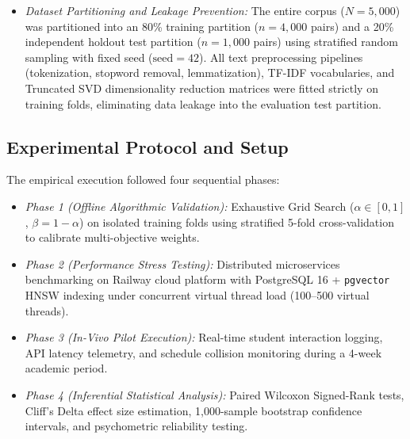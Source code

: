 \documentclass[a4paper,fleqn]{cas-dc}
\begin{document}
\begin{itemize}
    \item \textit{Dataset Partitioning and Leakage Prevention:} The entire corpus ($N = 5,000$) was partitioned into an 80\% training partition ($n = 4,000$ pairs) and a 20\% independent holdout test partition ($n = 1,000$ pairs) using stratified random sampling with fixed seed ($\text{seed} = 42$). All text preprocessing pipelines (tokenization, stopword removal, lemmatization), TF-IDF vocabularies, and Truncated SVD dimensionality reduction matrices were fitted strictly on training folds, eliminating data leakage into the evaluation test partition.
\end{itemize}

\subsection{Experimental Protocol and Setup}
The empirical execution followed four sequential phases:
\begin{itemize}
    \item \textit{Phase 1 (Offline Algorithmic Validation):} Exhaustive Grid Search ($\alpha \in [0, 1]$, $\beta = 1 - \alpha$) on isolated training folds using stratified 5-fold cross-validation to calibrate multi-objective weights.
    \item \textit{Phase 2 (Performance Stress Testing):} Distributed microservices benchmarking on Railway cloud platform with PostgreSQL 16 + \texttt{pgvector} HNSW indexing under concurrent virtual thread load (100--500 virtual threads).
    \item \textit{Phase 3 (In-Vivo Pilot Execution):} Real-time student interaction logging, API latency telemetry, and schedule collision monitoring during a 4-week academic period.
    \item \textit{Phase 4 (Inferential Statistical Analysis):} Paired Wilcoxon Signed-Rank tests, Cliff's Delta effect size estimation, 1,000-sample bootstrap confidence intervals, and psychometric reliability testing.
\end{itemize}
\end{document}
